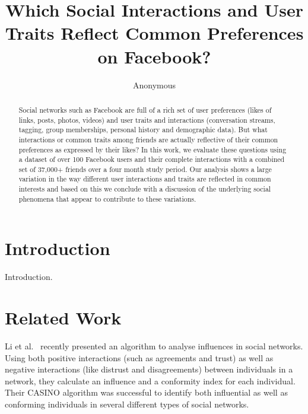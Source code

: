 \documentclass[letterpaper]{article}
\begin{document}
%
\title{Which Social Interactions and User Traits Reflect Common Preferences on Facebook?}
\author{Anonymous}
\maketitle
\begin{abstract}
Social networks such as Facebook are full of a rich set of user preferences (likes of links, posts, photos, videos) and user traits and interactions (conversation streams, tagging, group memberships, personal history and demographic data). But what interactions or common traits among friends are actually reflective of their common preferences as expressed by their likes? In this work, we evaluate these questions using a dataset of over 100 Facebook users and their complete interactions with a combined set of 37,000+ friends over a four month study period. Our analysis shows a large variation in the way different user interactions and traits are reflected in common interests and based on this we conclude with a discussion of the underlying social phenomena that appear to contribute to these variations.
\end{abstract}


\section{Introduction}


Introduction. \cite{influence}


\section{Related Work}




Li et al.~\cite{li2011casino} recently presented an algorithm to analyse influences in social networks. Using both positive interactions (such as agreements and trust) as well as negative interactions (like distrust and disagreements) between individuals in a network, they calculate an influence and a conformity index for each individual. Their CASINO algorithm was successful to identify both influential as well as conforming individuals in several different types of social networks.
\end{document}
